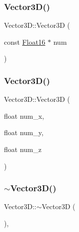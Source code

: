 \subsubsection{\texorpdfstring{Vector3\+D()}{Vector3D()}\hspace{0.1cm}{\footnotesize\ttfamily [4/5]}}
{\footnotesize\ttfamily Vector3\+D\+::\+Vector3D (\begin{DoxyParamCaption}\item[{const \mbox{\hyperlink{_vector3_d_8h_afe61185afc2bf3856c12613d99eede01}{Float16}} $\ast$}]{num }\end{DoxyParamCaption})\hspace{0.3cm}{\ttfamily [inline]}}

\mbox{\label{class_vector3_d_a01f2964e8b01e8e146eb4eca9ad36d2b}} 
\subsubsection{\texorpdfstring{Vector3\+D()}{Vector3D()}\hspace{0.1cm}{\footnotesize\ttfamily [5/5]}}
{\footnotesize\ttfamily Vector3\+D\+::\+Vector3D (\begin{DoxyParamCaption}\item[{float}]{num\+\_\+x,  }\item[{float}]{num\+\_\+y,  }\item[{float}]{num\+\_\+z }\end{DoxyParamCaption})\hspace{0.3cm}{\ttfamily [inline]}}

\mbox{\label{class_vector3_d_ae4fde5759270bf5bcf615f12f0823a8c}} 
\subsubsection{\texorpdfstring{$\sim$\+Vector3\+D()}{~Vector3D()}}
{\footnotesize\ttfamily Vector3\+D\+::$\sim$\+Vector3D (\begin{DoxyParamCaption}{ }\end{DoxyParamCaption})\hspace{0.3cm}{\ttfamily [inline]}, {\ttfamily [virtual]}}




